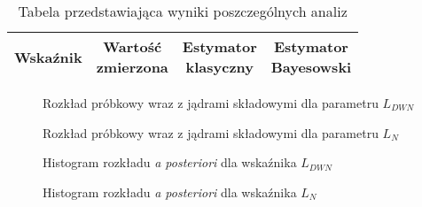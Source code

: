 \documentclass[polish,a4paper,11pt]{mwart}
\begin{document}
\begin{table}[!tbh]
  \centering
  \caption{Tabela przedstawiająca wyniki poszczególnych analiz}
  \begin{tabular}{|c|c|c|c|}
    \hline
    Wskaźnik & \makecell{Wartość \\ zmierzona} & \makecell{Estymator \\
    klasyczny} & \makecell{Estymator \\ Bayesowski} \\\hline
    
  \end{tabular}
  \label{tab:wyniki}
\end{table}

\begin{figure}[!tbh]
  \centering
  
  \caption{Rozkład próbkowy wraz z jądrami składowymi dla parametru $L_{DWN}$}
  \label{plot:kernel_ldwn}
\end{figure}

\begin{figure}[!tbh]
  \centering
  
  \caption{Rozkład próbkowy wraz z jądrami składowymi dla parametru $L_{N}$}
  \label{plot:kernel_ln}
\end{figure}

\begin{figure}[!tbh]
  \centering
  
  \caption{Histogram rozkładu \textit{a posteriori} dla wskaźnika $L_{DWN}$}
  \label{plot:hist_ldwn}
\end{figure}

\begin{figure}[!tbh]
  \centering
  
  \caption{Histogram rozkładu \textit{a posteriori} dla wskaźnika $L_{N}$}
  \label{plot:hist_ldwn}
\end{figure}
\end{document}

